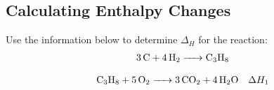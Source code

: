 \documentclass[../CHEM152Notes.tex]{subfiles}
\begin{document}
\subsection*{Calculating Enthalpy Changes}
\begin{exmp}
    Use the information below to determine $\Delta_H$ for the reaction:
    \begin{equation*}
        \begin{aligned}
            \ce{3 C + 4 H2 -> C3H8}
        \end{aligned}
    \end{equation*}
\end{exmp}
\begin{equation*}
    \begin{aligned}
        &\ce{C3H8 + 5 O2 -> 3 CO2 + 4 H2O} &\Delta H_1 \\
    \end{aligned}
\end{equation*}
\end{document}
